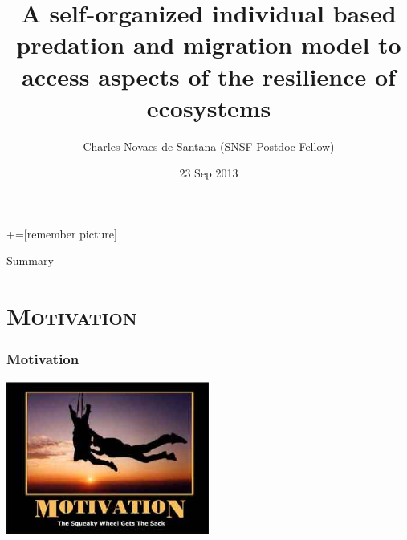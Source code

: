 \documentclass[xcolor=x11names,compress]{beamer}
\renewcommand{\(}{\begin{columns}}
\renewcommand{\)}{\end{columns}}
\newcommand{\<}[1]{\begin{column}{#1}}
\renewcommand{\>}{\end{column}}
\begin{document}
\def\newblock{\hskip .11em plus .33em minus .07em}
+=[remember picture]

\everymath{\displaystyle}

\title[Self Organized Food Web Model]{A self-organized individual based predation and migration model to access aspects of the resilience of ecosystems}
\author[C. N. de Santana]{Charles Novaes de Santana (\small{SNSF Postdoc Fellow})}
\date{23 Sep 2013}
\titlepage

\begin{frame}{Summary}
\tableofcontents
\end{frame}

\section{\scshape Motivation}

\begin{frame}
\frametitle{Motivation}
\centering \includegraphics[width=0.5\textwidth]{./motivation.eps}
\end{frame}
\end{document}
